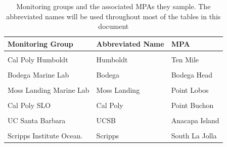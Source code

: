 \documentclass[
]{article}
\begin{document}
\begin{table}

\caption{\label{tab:monitoring}Monitoring groups and the associated MPAs they sample. The abbreviated names will be 
  used throughout most of the tables in this document}
\centering
\begin{tabular}[t]{lll}
\toprule
Monitoring Group & Abbreviated Name & MPA\\
\midrule
\cellcolor{gray!6}{Cal Poly Humboldt} & \cellcolor{gray!6}{Humboldt} & \cellcolor{gray!6}{South Cape Mendocino}\\
Cal Poly Humboldt & Humboldt & Ten Mile\\
\cellcolor{gray!6}{Bodega Marine Lab} & \cellcolor{gray!6}{Bodega} & \cellcolor{gray!6}{Stewarts Point}\\
Bodega Marine Lab & Bodega & Bodega Head\\
\cellcolor{gray!6}{Moss Landing Marine Lab} & \cellcolor{gray!6}{Moss Landing} & \cellcolor{gray!6}{Ano Nuevo}\\
\addlinespace
Moss Landing Marine Lab & Moss Landing & Point Lobos\\
\cellcolor{gray!6}{Cal Poly SLO} & \cellcolor{gray!6}{Cal Poly} & \cellcolor{gray!6}{Piedras Blancas}\\
Cal Poly SLO & Cal Poly & Point Buchon\\
\cellcolor{gray!6}{UC Santa Barbara} & \cellcolor{gray!6}{UCSB} & \cellcolor{gray!6}{Carrington Point}\\
UC Santa Barbara & UCSB & Anacapa Island\\
\addlinespace
\cellcolor{gray!6}{Scripps Institute Ocean.} & \cellcolor{gray!6}{Scripps} & \cellcolor{gray!6}{Swamis}\\
Scripps Institute Ocean. & Scripps & South La Jolla\\
\bottomrule
\end{tabular}
\end{table}
\end{document}
